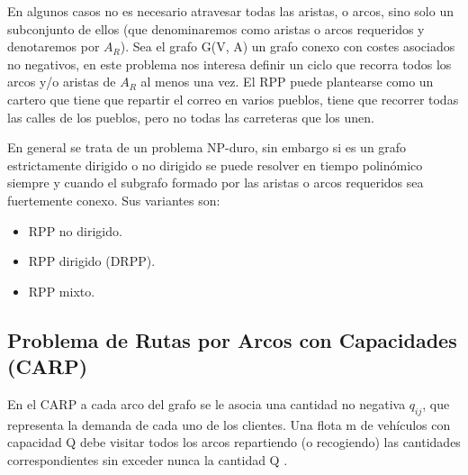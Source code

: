 En algunos casos no es necesario atravesar todas las aristas, o arcos, sino solo un subconjunto de ellos (que denominaremos como aristas o arcos requeridos y denotaremos por $A_R$). Sea el grafo G(V, A) un grafo conexo con costes asociados no negativos, en este problema nos interesa definir un ciclo que recorra todos los arcos y/o aristas de $A_R$ al menos una vez. El RPP puede plantearse como un cartero que tiene que repartir el correo en varios pueblos, tiene que recorrer todas las calles de los pueblos, pero no todas las carreteras que los unen.

En general se trata de un problema NP-duro, sin embargo si es un grafo estrictamente dirigido o no dirigido se puede resolver en tiempo polinómico siempre y cuando el subgrafo formado por las aristas o arcos requeridos sea fuertemente conexo. Sus variantes son:

\begin{itemize}
    \item RPP no dirigido.
    \item RPP dirigido (DRPP).
    \item RPP mixto.
\end{itemize}


\subsection{Problema de Rutas por Arcos con Capacidades (CARP)}

En el CARP a cada arco del grafo se le asocia una cantidad no negativa $q_{ij}$, que representa la demanda de cada uno de los clientes. Una flota m de vehículos con capacidad Q debe visitar todos los arcos repartiendo (o recogiendo) las cantidades correspondientes sin exceder nunca la cantidad Q \citep{YordaPerez2014ElChino}.



